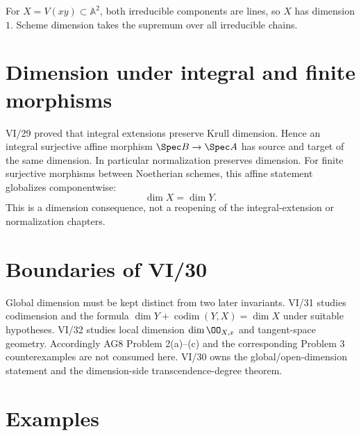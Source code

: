 \begin{example}\label{ex:vi30-expand-03}
For $X=V(xy)\subset\mathbb A^2$, both irreducible components are lines, so $X$ has dimension $1$.  Scheme dimension takes the supremum over all irreducible chains.
\end{example}
\section{Dimension under integral and finite morphisms}\label{sec:vi30-integral-morphisms}
VI/29 proved that integral extensions preserve Krull dimension.  Hence an integral surjective affine morphism
$\Spec B\to\Spec A$ has source and target of the same dimension.  In particular normalization preserves dimension.
For finite surjective morphisms between Noetherian schemes, this affine statement globalizes componentwise:
\[
\dim X=\dim Y.
\]
This is a dimension consequence, not a reopening of the integral-extension or normalization chapters.


\section{Boundaries of VI/30}\label{sec:vi30-boundaries}
Global dimension must be kept distinct from two later invariants.  VI/31 studies codimension and the formula
$\dim Y+\operatorname{codim}(Y,X)=\dim X$ under suitable hypotheses.  VI/32 studies local dimension
$\dim\OO_{X,x}$ and tangent-space geometry.  Accordingly AG8 Problem 2(a)--(c) and the corresponding Problem 3
counterexamples are not consumed here.  VI/30 owns the global/open-dimension statement and the dimension-side
transcendence-degree theorem.

\section{Examples}



